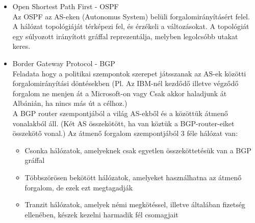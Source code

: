 \documentclass[margin=0px]{article}
\begin{document}
\begin{description}
\begin{itemize}
            \item Open Shortest Path First - OSPF \\
                  Az OSPF az AS-eken (Autonomus System) belüli forgalomirányításért felel. A hálózat topológiáját térképezi fel, és érzékeli a változásokat. A topológiát egy súlyozott irányított gráffal reprezentálja, melyben legolcsóbb utakat keres.
            \item Border Gateway Protocol - BGP \\
                  Feladata hogy a politikai szempontok szerepet játsszanak az AS-ek közötti forgalomirányítási döntésekben (Pl. Az IBM-nél kezdődő illetve végződő forgalom ne menjen át a Microsoft-on vagy Csak akkor haladjunk át Albánián, ha nincs más út a célhoz.)\\
                  A BGP router szempontjából a világ AS-ekből és a közöttük átmenő vonalakból áll. (Két AS összekötött, ha van köztük a BGP-router-eiket összekötő vonal.)
                  Az átmenő forgalom szempontjából 3 féle hálózat van:
                  \begin{itemize}
                      \item Csonka hálózatok, amelyeknek csak egyetlen összeköttetésük van a BGP gráffal
                      \item Többszörösen bekötött hálózatok, amelyeket használhatna az átmenő forgalom, de ezek ezt megtagadják
                      \item Tranzit hálózatok, amelyek némi megkötéssel, illetve általában fizetség ellenében, készek kezelni harmadik fél csomagjait
                  \end{itemize}
        \end{itemize}
\end{description}
\end{document}
